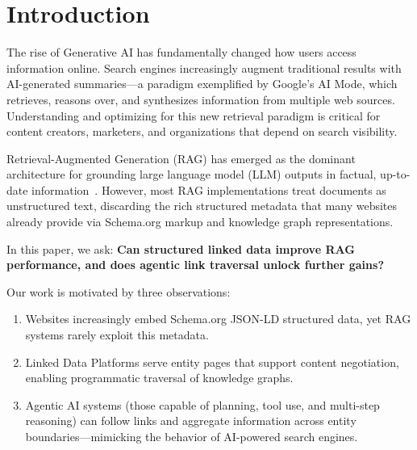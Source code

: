 \documentclass[runningheads]{llncs}
\begin{document}
\section{Introduction}
\label{sec:intro}

The rise of Generative AI has fundamentally changed how users access
information online. Search engines increasingly augment traditional
results with AI-generated summaries---a paradigm exemplified by
Google's AI Mode, which retrieves, reasons over, and synthesizes
information from multiple web sources. Understanding and optimizing
for this new retrieval paradigm is critical for content creators,
marketers, and organizations that depend on search visibility.

Retrieval-Augmented Generation (RAG) has emerged as the dominant
architecture for grounding large language model (LLM) outputs in
factual, up-to-date information~\cite{lewis2020rag}. However, most
RAG implementations treat documents as unstructured text, discarding
the rich structured metadata that many websites already provide via
Schema.org markup and knowledge graph representations.

In this paper, we ask: \textbf{Can structured linked data improve
RAG performance, and does agentic link traversal unlock further gains?}

Our work is motivated by three observations:
\begin{enumerate}
    \item Websites increasingly embed Schema.org JSON-LD structured data,
          yet RAG systems rarely exploit this metadata.
    \item Linked Data Platforms serve entity pages that support content
          negotiation, enabling programmatic traversal of knowledge graphs.
    \item Agentic AI systems (those capable of planning, tool use, and
          multi-step reasoning) can follow links and aggregate information
          across entity boundaries---mimicking the behavior of AI-powered
          search engines.
\end{enumerate}
\end{document}
